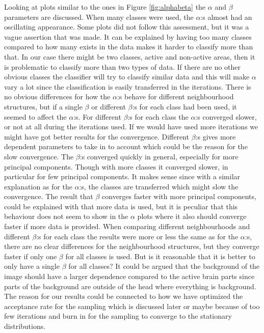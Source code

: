 \documentclass[a4paper,english]{article}
\begin{document}
Looking at plots similar to the ones in Figure \ref{fig:alphabeta} the $\alpha$ and $\beta$ parameters are discussed.
When many classes were used, the $\alpha$:s almost had an oscillating appearance. Some plots did not follow this assessment, but it was a vague assertion that was made.
It can be explained by having too many classes compared to how many exists in the data makes it harder to classify more than that. In our case there might be two classes, active and non-active areas, then it is problematic to classify more than two types of data.
If there are no other obvious classes the classifier will try to classify similar data and this will make $\alpha$ vary a lot since the classification is easily transferred in the iterations. There is no obvious differences for how the $\alpha$:s behave for different neighbourhood structures, but if a single $\beta$ or different $\beta$:s for each class had been used, it seemed to affect the $\alpha$:s.
For different $\beta$:s for each class the $\alpha$:s converged slower, or not at all during the iterations used.
If we would have used more iterations we might have got better results for the convergence.
Different $\beta$:s gives more dependent parameters to take in to account which could be the reason for the slow convergence.
The $\beta$:s converged quickly in general, especially for more principal components.
Though with more classes it converged slower, in particular for few principal components.
It makes sense since with a similar explanation as for the $\alpha$:s, the classes are transferred which might slow the convergence.
The result that $\beta$ converges faster with more principal components, could be explained with that more data is used, but it is peculiar that this behaviour does not seem to show in the $\alpha$ plots where it also should converge faster if more data is provided.
When comparing different neighbourhoods and different $\beta$:s for each class the results were more or less the same as for the $\alpha$:s, there are no clear differences for the neighbourhood structures, but they converge faster if only one $\beta$ for all classes is used.
But is it reasonable that it is better to only have a single $\beta$ for all classes?
It could be argued that the background of the image should have a larger dependence compared to the active brain parts since parts of the background are outside of the head where everything is background.
The reason for our results could be connected to how we have optimized the acceptance rate for the sampling which is discussed later or maybe because of too few iterations and burn in for the sampling to converge to the stationary distributions.
\end{document}
